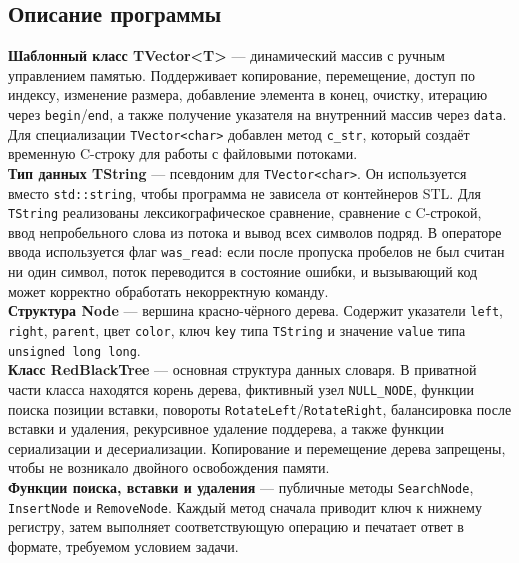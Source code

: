 \documentclass[12pt]{article}
\begin{document}
\subsection*{Описание программы}
\hspace{2ex}
\textbf{Шаблонный класс TVector<T>} — динамический массив с ручным управлением памятью. Поддерживает копирование, перемещение, доступ по индексу, изменение размера, добавление элемента в конец, очистку, итерацию через \texttt{begin}/\texttt{end}, а также получение указателя на внутренний массив через \texttt{data}. Для специализации \texttt{TVector<char>} добавлен метод \texttt{c\_str}, который создаёт временную C-строку для работы с файловыми потоками. \\

\textbf{Тип данных TString} — псевдоним для \texttt{TVector<char>}. Он используется вместо \texttt{std::string}, чтобы программа не зависела от контейнеров STL. Для \texttt{TString} реализованы лексикографическое сравнение, сравнение с C-строкой, ввод непробельного слова из потока и вывод всех символов подряд. В операторе ввода используется флаг \texttt{was\_read}: если после пропуска пробелов не был считан ни один символ, поток переводится в состояние ошибки, и вызывающий код может корректно обработать некорректную команду. \\

\textbf{Структура Node} — вершина красно-чёрного дерева. Содержит указатели \texttt{left}, \texttt{right}, \texttt{parent}, цвет \texttt{color}, ключ \texttt{key} типа \texttt{TString} и значение \texttt{value} типа \texttt{unsigned long long}. \\

\textbf{Класс RedBlackTree} — основная структура данных словаря. В приватной части класса находятся корень дерева, фиктивный узел \texttt{NULL\_NODE}, функции поиска позиции вставки, повороты \texttt{RotateLeft}/\texttt{RotateRight}, балансировка после вставки и удаления, рекурсивное удаление поддерева, а также функции сериализации и десериализации. Копирование и перемещение дерева запрещены, чтобы не возникало двойного освобождения памяти. \\

\textbf{Функции поиска, вставки и удаления} — публичные методы \texttt{SearchNode}, \texttt{InsertNode} и \texttt{RemoveNode}. Каждый метод сначала приводит ключ к нижнему регистру, затем выполняет соответствующую операцию и печатает ответ в формате, требуемом условием задачи. \\
\end{document}
